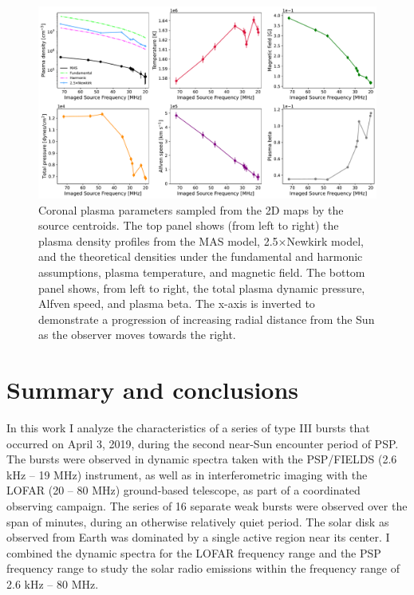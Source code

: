 \begin{figure}[ht]
\centering
\includegraphics[width=\textwidth]{chapter3/figs/scatterplots_FORWARD_plasma_diagnostics_2019-04-01_4R.pdf}
\caption{Coronal plasma parameters sampled from the 2D maps by the source centroids. The top panel shows (from left to right) the plasma density profiles from the MAS model, 2.5×Newkirk model, and the theoretical densities under the fundamental and harmonic assumptions, plasma temperature, and magnetic field. The bottom panel shows, from left to right, the total plasma dynamic pressure, Alfven speed, and plasma beta. The x-axis is inverted to demonstrate a progression of increasing radial distance from the Sun as the observer moves towards the right.}
\label{scatterplot}
\end{figure}

\section{Summary and conclusions}
\label{sec_ch3_conclusions}
In this work I analyze the characteristics of a series of type III bursts that occurred on April 3, 2019, during the second near-Sun encounter period of PSP. The bursts were observed in dynamic spectra taken with the PSP/FIELDS (2.6 kHz – 19 MHz) instrument, as well as in interferometric imaging with the LOFAR (20 – 80 MHz) ground-based telescope, as part of a coordinated observing campaign. The series of 16 separate weak bursts were observed over the span of  minutes, during an otherwise relatively quiet period. The solar disk as observed from Earth was dominated by a single active region near its center. I combined the dynamic spectra for the LOFAR frequency range and the PSP frequency range to study the solar radio emissions within the frequency range of 2.6 kHz – 80 MHz. 

